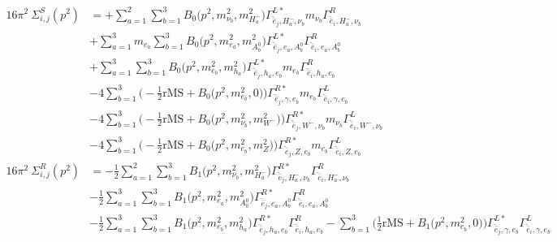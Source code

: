 \begin{itemize}
\begin{align} 
16\pi^2 \ \Sigma^S_{i,j}(p^2) &= +\sum_{a=1}^{2}\sum_{b=1}^{3}{B_0\Big(p^{2},m^2_{\nu_{{b}}},m^2_{H^-_{{a}}}\Big)} {\Gamma^{L*}_{\check{\bar{e}}_{{j}},H^-_{{a}},\nu_{{b}}}} m_{\nu_{{b}}} {\Gamma^R_{\check{\bar{e}}_{{i}},H^-_{{a}},\nu_{{b}}}} \nonumber \\ 
 &+\sum_{a=1}^{3}m_{e_{{a}}} \sum_{b=1}^{3}{B_0\Big(p^{2},m^2_{e_{{a}}},m^2_{A^0_{{b}}}\Big)} {\Gamma^{L*}_{\check{\bar{e}}_{{j}},e_{{a}},A^0_{{b}}}} {\Gamma^R_{\check{\bar{e}}_{{i}},e_{{a}},A^0_{{b}}}}  \nonumber \\ 
 &+\sum_{a=1}^{3}\sum_{b=1}^{3}{B_0\Big(p^{2},m^2_{e_{{b}}},m^2_{h_{{a}}}\Big)} {\Gamma^{L*}_{\check{\bar{e}}_{{j}},h_{{a}},e_{{b}}}} m_{e_{{b}}} {\Gamma^R_{\check{\bar{e}}_{{i}},h_{{a}},e_{{b}}}} \nonumber \\ 
 &-4 \sum_{b=1}^{3}\Big(-\frac{1}{2} \text{rMS}  + {B_0\Big(p^{2},m^2_{e_{{b}}},0\Big)}\Big){\Gamma^{R*}_{\check{\bar{e}}_{{j}},\gamma,e_{{b}}}} m_{e_{{b}}} {\Gamma^L_{\check{\bar{e}}_{{i}},\gamma,e_{{b}}}}  \nonumber \\ 
 &-4 \sum_{b=1}^{3}\Big(-\frac{1}{2} \text{rMS}  + {B_0\Big(p^{2},m^2_{\nu_{{b}}},m^2_{W^-}\Big)}\Big){\Gamma^{R*}_{\check{\bar{e}}_{{j}},W^-,\nu_{{b}}}} m_{\nu_{{b}}} {\Gamma^L_{\check{\bar{e}}_{{i}},W^-,\nu_{{b}}}}  \nonumber \\ 
 &-4 \sum_{b=1}^{3}\Big(-\frac{1}{2} \text{rMS}  + {B_0\Big(p^{2},m^2_{e_{{b}}},m^2_{Z}\Big)}\Big){\Gamma^{R*}_{\check{\bar{e}}_{{j}},Z,e_{{b}}}} m_{e_{{b}}} {\Gamma^L_{\check{\bar{e}}_{{i}},Z,e_{{b}}}}  \\ 
16\pi^2 \ \Sigma^R_{i,j}(p^2) &= -\frac{1}{2} \sum_{a=1}^{2}\sum_{b=1}^{3}{B_1\Big(p^{2},m^2_{\nu_{{b}}},m^2_{H^-_{{a}}}\Big)} {\Gamma^{R*}_{\check{\bar{e}}_{{j}},H^-_{{a}},\nu_{{b}}}} {\Gamma^R_{\check{\bar{e}}_{{i}},H^-_{{a}},\nu_{{b}}}}  \nonumber \\ 
 &-\frac{1}{2} \sum_{a=1}^{3}\sum_{b=1}^{3}{B_1\Big(p^{2},m^2_{e_{{a}}},m^2_{A^0_{{b}}}\Big)} {\Gamma^{R*}_{\check{\bar{e}}_{{j}},e_{{a}},A^0_{{b}}}} {\Gamma^R_{\check{\bar{e}}_{{i}},e_{{a}},A^0_{{b}}}}  \nonumber \\ 
 &-\frac{1}{2} \sum_{a=1}^{3}\sum_{b=1}^{3}{B_1\Big(p^{2},m^2_{e_{{b}}},m^2_{h_{{a}}}\Big)} {\Gamma^{R*}_{\check{\bar{e}}_{{j}},h_{{a}},e_{{b}}}} {\Gamma^R_{\check{\bar{e}}_{{i}},h_{{a}},e_{{b}}}}  - \sum_{b=1}^{3}\Big(\frac{1}{2} \text{rMS}  + {B_1\Big(p^{2},m^2_{e_{{b}}},0\Big)}\Big){\Gamma^{L*}_{\check{\bar{e}}_{{j}},\gamma,e_{{b}}}} {\Gamma^L_{\check{\bar{e}}_{{i}},\gamma,e_{{b}}}}  \nonumber \\ 

\end{align}
\end{itemize}
